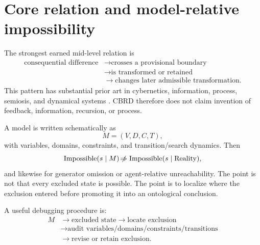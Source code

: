 \section{Core relation and model-relative impossibility}

The strongest earned mid-level relation is
\begin{align}
\text{consequential difference}
&\rightarrow\text{crosses a provisional boundary}\nonumber\\
&\rightarrow\text{is transformed or retained}\nonumber\\
&\rightarrow\text{changes later admissible transformation}.
\end{align}
This pattern has substantial prior art in cybernetics, information, process, semiosis, and dynamical systems \cite{Wiener1948,Bateson1972,vonFoerster2003,Pattee2001,CrutchfieldYoung1989}. CBRD therefore does not claim invention of feedback, information, recursion, or process.

A model is written schematically as
\begin{equation}
M=(V,D,C,T),
\end{equation}
with variables, domains, constraints, and transition/search dynamics. Then
\begin{equation}
\mathrm{Impossible}(s\mid M)\mathrel{\not\!\Rightarrow}\mathrm{Impossible}(s\mid\mathrm{Reality}),
\end{equation}
and likewise for generator omission or agent-relative unreachability. The point is not that every excluded state is possible. The point is to localize where the exclusion entered before promoting it into an ontological conclusion.

A useful debugging procedure is:
\begin{align}
M&\rightarrow\text{excluded state}\rightarrow\text{locate exclusion}\nonumber\\
&\rightarrow\text{audit variables/domains/constraints/transitions}\nonumber\\
&\rightarrow\text{revise or retain exclusion}.
\end{align}
